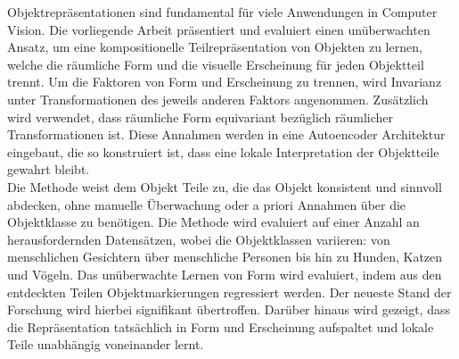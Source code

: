 Objektrepräsentationen sind fundamental für viele Anwendungen in Computer Vision. Die vorliegende Arbeit präsentiert und evaluiert einen unüberwachten Ansatz, um eine kompositionelle Teilrepräsentation von Objekten zu lernen, welche die räumliche Form und die visuelle Erscheinung für jeden Objektteil trennt. Um die Faktoren von Form und Erscheinung zu trennen, wird Invarianz unter Transformationen des jeweils anderen Faktors angenommen. Zusätzlich wird verwendet, dass räumliche Form equivariant bezüglich räumlicher Transformationen ist. Diese Annahmen werden in eine Autoencoder Architektur eingebaut, die so konstruiert ist, dass eine lokale Interpretation der Objektteile gewahrt bleibt. \\
Die Methode weist dem Objekt Teile zu, die das Objekt konsistent und sinnvoll abdecken, ohne manuelle Überwachung oder a priori Annahmen über die Objektklasse zu benötigen.
Die Methode wird evaluiert auf einer Anzahl an herausfordernden Datensätzen, wobei die Objektklassen variieren: von menschlichen Gesichtern über menschliche Personen bis hin zu Hunden, Katzen und Vögeln. Das unüberwachte Lernen von Form wird evaluiert, indem aus den entdeckten Teilen Objektmarkierungen regressiert werden. Der neueste Stand der Forschung wird hierbei signifikant übertroffen. Darüber hinaus wird gezeigt, dass die Repräsentation tatsächlich in Form und Erscheinung aufspaltet und lokale Teile unabhängig voneinander lernt.
